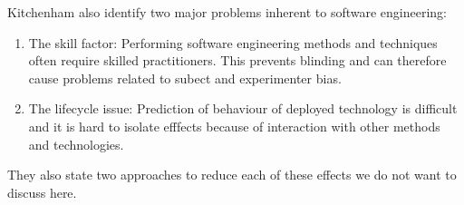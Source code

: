 Kitchenham \etal \cite{EBSE} also identify two major problems inherent to software engineering:
\begin{enumerate}
\item The skill factor: Performing software engineering methods and techniques often require skilled practitioners. This prevents blinding and can therefore cause problems related to subect and experimenter bias.
\item The lifecycle issue: Prediction of behaviour  of deployed technology is difficult and it is hard to isolate efffects because of interaction with other methods and technologies.
\end{enumerate}

They also state two approaches to reduce each of these effects we do not want to discuss here.



